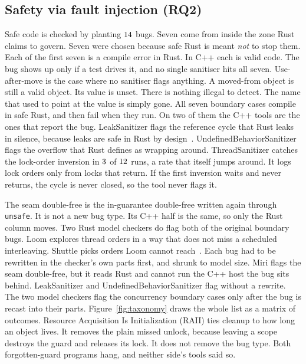 \documentclass[english,oneside,a4paper,censored,csm,software-track-2020]{HYthesisML}
\begin{document}
\subsection{Safety via fault injection (RQ2)}\label{sec:safetyresults}
Safe code is checked by planting $14$ bugs.
Seven come from inside the zone Rust claims to govern.
Seven were chosen because safe Rust is meant \emph{not} to stop them.
Each of the first seven is a compile error in Rust.
In C++ each is valid code.
The bug shows up only if a test drives it, and no single sanitiser hits all seven.
Use-after-move is the case where no sanitiser flags anything.
A moved-from object is still a valid object. Its value is unset.
There is nothing illegal to detect. The name that used to point at the value is simply gone.
All seven boundary cases compile in safe Rust, and then fail when they run.
On two of them the C++ tools are the ones that report the bug.
LeakSanitizer flags the reference cycle that Rust leaks in silence, because leaks are safe in Rust by design~\cite{hughes2025gcrust,cui2024rcanary}.
UndefinedBehaviorSanitizer flags the overflow that Rust defines as wrapping around.
ThreadSanitizer catches the lock-order inversion in $3$ of $12$ runs, a rate that itself jumps around.
It logs lock orders only from locks that return.
If the first inversion waits and never returns, the cycle is never closed, so the tool never flags it.

The seam double-free is the in-guarantee double-free written again through \texttt{unsafe}. It is not a new bug type.
Its C++ half is the same, so only the Rust column moves.
Two Rust model checkers do flag both of the original boundary bugs.
Loom explores thread orders in a way that does not miss a scheduled interleaving.
Shuttle picks orders Loom cannot reach~\cite{bornholt2021shardstore}.
Each bug had to be rewritten in the checker's own parts first, and shrunk to model size.
Miri flags the seam double-free, but it reads Rust and cannot run the C++ host the bug sits behind.
LeakSanitizer and UndefinedBehaviorSanitizer flag without a rewrite.
The two model checkers flag the concurrency boundary cases only after the bug is recast into their parts.
Figure~\ref{fig:taxonomy} draws the whole list as a matrix of outcomes.
Resource Acquisition Is Initialization (RAII) ties cleanup to how long an object lives.
It removes the plain missed unlock, because leaving a scope destroys the guard and releases its lock.
It does not remove the bug type.
Both forgotten-guard programs hang, and neither side's tools said so.
\end{document}
